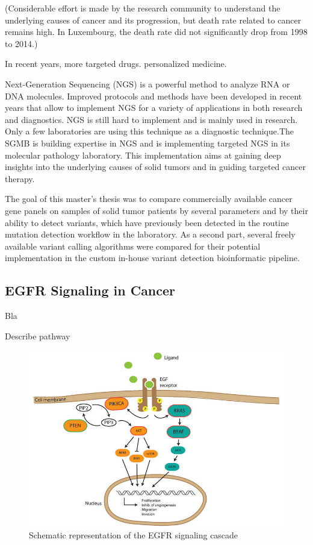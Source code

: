 (Considerable effort is made by the research
community to understand the underlying causes of cancer and its progression, but
death rate related to cancer remains high. In Luxembourg, the death rate did not
significantly drop from 1998 to 2014.)

In recent years, more targeted drugs. personalized medicine.

Next-Generation Sequencing (NGS) is a powerful method to analyze RNA or DNA
molecules. Improved protocols and methods have been developed in recent years
that allow to implement NGS for a variety of applications in both research and
diagnostics. NGS is still hard to implement and is mainly used in research. Only
a few laboratories are using this technique as a diagnostic technique.The SGMB
is building expertise in NGS and is implementing targeted NGS in its molecular
pathology laboratory. This implementation aims at gaining deep insights into the
underlying causes of solid tumors and in guiding targeted cancer therapy.

The goal of this master's thesis was to compare commercially available cancer
gene panels on samples of solid tumor patients by several parameters and by
their ability to detect variants, which have previously been detected in the
routine mutation detection workflow in the laboratory. As a second part, several
freely available variant calling algorithms were compared for their potential
implementation in the custom in-house variant detection bioinformatic pipeline.

\subsection{EGFR Signaling in Cancer}

Bla {\cite{targeting_egfr:2012}}

Describe pathway

\begin{figure}[ht]
  \begin{center}
    \includegraphics[scale=1,angle=0]{egfr_signaling.png}
    \caption{Schematic representation of the EGFR signaling cascade {\cite{targeting_egfr:2012}}}
    \label{Fig:egfr_signaling}
  \end{center}
\end{figure}

